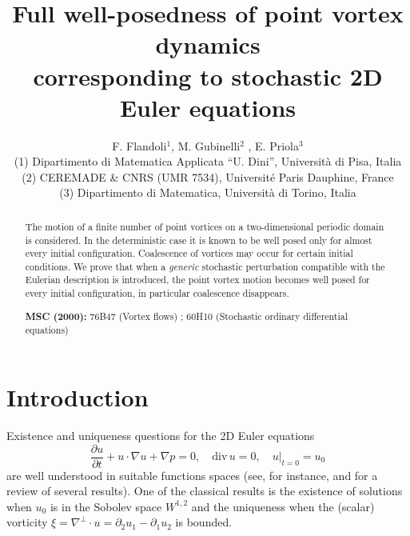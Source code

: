 \documentclass[11pt,a4paper]{article}%
\begin{document}
\title{Full well-posedness of point vortex dynamics\\corresponding to stochastic 2D Euler equations}
\author{F. Flandoli$^{1}$, M. Gubinelli$^{2}$ , E. Priola$^{3}$\\{\small {(1) Dipartimento di Matematica Applicata ``U. Dini'', Universit\`a di
Pisa, Italia}}\\{\small { (2) CEREMADE \& CNRS (UMR 7534), Universit\'e Paris Dauphine,
France}}\\{\small { (3) Dipartimento di Matematica, Universit\`a di Torino, Italia }}}
\maketitle

\begin{abstract}
The motion of a finite number of point vortices
on a two-dimensional periodic domain is considered.
 In the deterministic case
  it is known to be well posed only for almost every
 initial configuration. Coalescence of vortices may occur for certain
initial conditions. We prove that when a \emph{generic} stochastic
perturbation compatible with the Eulerian description is introduced,
the point
vortex motion becomes  well posed for
every initial configuration, in particular coalescence disappears.

\bigskip
\noindent\textbf{MSC (2000):} 76B47 (Vortex flows) ;  60H10  (Stochastic ordinary differential equations)
\end{abstract}


\section{Introduction}

Existence and uniqueness questions for the 2D Euler equations
\begin{equation}
\frac{\partial u}{\partial t}+u\cdot\nabla u+\nabla p=0,\quad\mathrm{div}\,%
u=0,\quad u|_{t=0}=u_{0} \label{Eulerian for velocity}%
\end{equation}
are well understood in suitable functions spaces (see, for instance,
\cite{MajdaBert} and \cite{PL Lions} for a review of several results). One of
the classical results is the existence of solutions when $u_{0}$ is in the
Sobolev space $W^{1,2}$ and the uniqueness when the (scalar) vorticity
$\xi=\nabla^{\perp}\cdot u=\partial_{2}u_{1}-\partial_{1}u_{2}$ is bounded.
\end{document}
